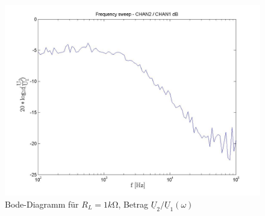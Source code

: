 \documentclass[a4paper]{article}
\begin{document}


\begin{figure}[H]
    \centering
    \includegraphics[width=0.8\linewidth]{versuch4/versuch4-1kohm-betrag.jpg}
    \caption{Bode-Diagramm für $R_L=1\si{k\ohm}$, Betrag $\underline{U}_2/\underline{U}_1(\omega)$}
    \label{fig:4-1kohm-betrag}
\end{figure}

\end{document}
